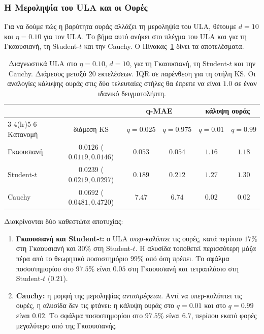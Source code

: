 \subsubsection{Η Μεροληψία του ULA και οι Ουρές}
\label{sec:ula-tails}

Για να δούμε πώς η βαρύτητα ουράς αλλάζει τη μεροληψία του ULA, θέτουμε
$d=10$ και $\eta=0.10$ για τον ULA. Το βήμα αυτό ανήκει στο πλέγμα του ULA και για
τη Γκαουσιανή, τη Student-$t$ και την Cauchy.
Ο Πίνακας~\ref{tab:ula-tails} δίνει τα αποτελέσματα.

\begin{table}[H]
\centering
\small
\begin{tabular}{lccccc}
\toprule
             &                         & \multicolumn{2}{c}{q-MAE} & \multicolumn{2}{c}{κάλυψη ουράς} \\
\cmidrule(lr){3-4}\cmidrule(lr){5-6}
Κατανομή     & διάμεση KS              & $q=0.025$ & $q=0.975$ & $q=0.01$ & $q=0.99$ \\
\midrule
Γκαουσιανή   & $0.0126$ ($0.0119, 0.0146$)  & $0.053$ & $0.054$ & $1.16$ & $1.18$ \\
Student-$t$  & $0.0239$ ($0.0219, 0.0297$)  & $0.189$ & $0.212$ & $1.27$ & $1.30$ \\
Cauchy       & $0.0692$ ($0.0481, 0.4720$)  & $7.47$  & $6.74$  & $0.02$ & $0.02$ \\
\bottomrule
\end{tabular}
\caption{Διαγνωστικά ULA στο $\eta=0.10$, $d=10$, για τη Γκαουσιανή, τη Student-$t$ και την Cauchy.
Διάμεσος μεταξύ $20$ εκτελέσεων. IQR σε παρένθεση για τη στήλη KS. Οι αναλογίες
κάλυψης ουράς στις δύο τελευταίες στήλες θα έπρεπε να είναι $1.0$ σε έναν
ιδανικό δειγματολήπτη.}
\label{tab:ula-tails}
\end{table}

Διακρίνονται δύο καθεστώτα αποτυχίας:

\begin{enumerate}
  \item \textbf{Γκαουσιανή και Student-$t$:} ο ULA \emph{υπερ-καλύπτει} τις ουρές,
        κατά περίπου $17\%$ στη Γκαουσιανή και $30\%$ στη Student-$t$. Η αλυσίδα
        τοποθετεί περισσότερη μάζα πέρα από το θεωρητικό ποσοστημόριο $99\%$ από όση
        πρέπει. Το σφάλμα ποσοστημορίου στο $97.5\%$ είναι $0.05$ στη Γκαουσιανή και
        τετραπλάσιο στη Student-$t$ ($0.21$).
  \item \textbf{Cauchy:} η μορφή της μεροληψίας \emph{αντιστρέφεται}. Αντί να
        υπερ-καλύπτει τις ουρές, η αλυσίδα δεν τις φτάνει: η κάλυψη ουράς
        στο $q=0.01$ και στο $q=0.99$ είναι $0.02$. Το σφάλμα ποσοστημορίου στο
        $97.5\%$ είναι $6.7$, περίπου εκατό φορές μεγαλύτερο από της Γκαουσιανής.
\end{enumerate}

